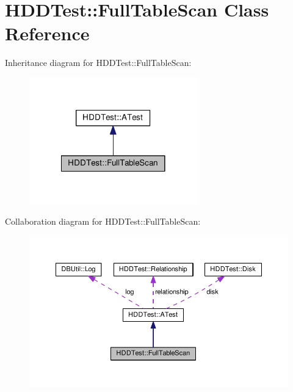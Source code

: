 \hypertarget{class_h_d_d_test_1_1_full_table_scan}{\section{H\-D\-D\-Test\-:\-:Full\-Table\-Scan Class Reference}
\label{class_h_d_d_test_1_1_full_table_scan}
}


Inheritance diagram for H\-D\-D\-Test\-:\-:Full\-Table\-Scan\-:
\nopagebreak
\begin{figure}[H]
\begin{center}
\leavevmode
\includegraphics[width=206pt]{class_h_d_d_test_1_1_full_table_scan__inherit__graph}
\end{center}
\end{figure}


Collaboration diagram for H\-D\-D\-Test\-:\-:Full\-Table\-Scan\-:
\nopagebreak
\begin{figure}[H]
\begin{center}
\leavevmode
\includegraphics[width=350pt]{class_h_d_d_test_1_1_full_table_scan__coll__graph}
\end{center}
\end{figure}
